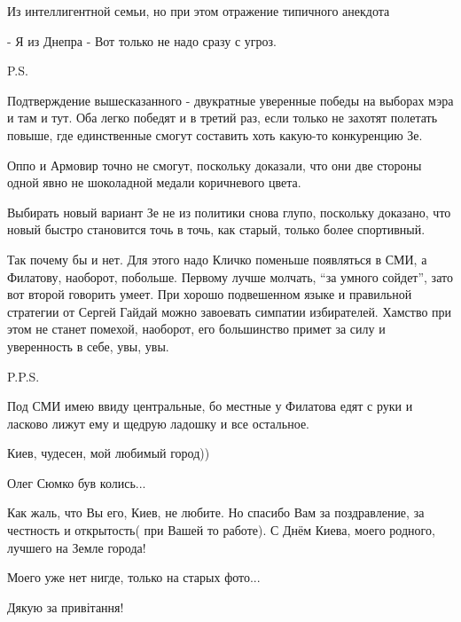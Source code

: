 \begin{itemize}
Из интеллигентной семьи, но при этом отражение типичного анекдота

- Я из Днепра
- Вот только не надо сразу с угроз.

P.S.

Подтверждение вышесказанного - двукратные уверенные победы на выборах мэра и
там и тут. Оба легко победят и в третий раз, если только не захотят полетать
повыше, где единственные смогут составить хоть какую-то конкуренцию Зе.

Оппо и Армовир точно не смогут, поскольку доказали, что они две стороны одной
явно не шоколадной медали коричневого цвета.

Выбирать новый вариант Зе не из политики снова глупо, поскольку доказано, что
новый быстро становится точь в точь, как старый, только более спортивный.

Так почему бы и нет. Для этого надо Кличко поменьше появляться в СМИ, а
Филатову, наоборот, побольше. Первому лучше молчать, \enquote{за умного сойдет}, зато
вот второй говорить умеет. При хорошо подвешенном языке и правильной стратегии
от Сергей Гайдай можно завоевать симпатии избирателей. Хамство при этом не
станет помехой, наоборот, его большинство примет за силу и уверенность в себе,
увы, увы.

P.P.S.

Под СМИ имею ввиду центральные, бо местные у Филатова едят с руки и ласково
лижут ему и щедрую ладошку и все остальное.


Киев, чудесен, мой любимый город))


Олег Сюмко був колись...


Как жаль, что Вы его, Киев, не любите. Но спасибо Вам за поздравление, за
честность и открытость( при Вашей то работе). С Днём Киева, моего родного,
лучшего на Земле города!


Моего уже нет нигде, только на старых фото...


Дякую за привітання!

\end{itemize}
